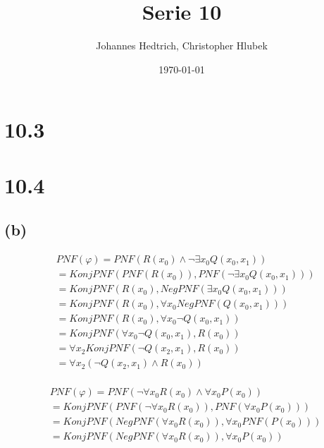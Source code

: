 \documentclass[12pt,a4paper]{scrartcl}
\title{Serie 10}
\author{Johannes Hedtrich, Christopher Hlubek}
\date{\today}
\begin{document}
  \section*{10.3}
  
  \section*{10.4}
  
  \subsection*{(b)}
    \begin{align*}
      & PNF(\varphi) = PNF(R(x_0) \wedge \neg \exists x_0 Q(x_0, x_1))\\
      &= KonjPNF(PNF(R(x_0)), PNF(\neg \exists x_0 Q(x_0, x_1)))\\
      &= KonjPNF(R(x_0), NegPNF(\exists x_0 Q(x_0, x_1)))\\
      &= KonjPNF(R(x_0), \forall x_0 NegPNF(Q(x_0, x_1)))\\
      &= KonjPNF(R(x_0), \forall x_0 \neg Q(x_0, x_1))\\
      &= KonjPNF(\forall x_0 \neg Q(x_0, x_1), R(x_0))\\
      &= \forall x_2 KonjPNF(\neg Q(x_2, x_1), R(x_0))\\
      &= \forall x_2 (\neg Q(x_2, x_1) \wedge R(x_0))\\
  \end{align*}

  \begin{align*}
      & PNF(\varphi) = PNF(\neg \forall x_0 R(x_0) \wedge \forall x_0 P(x_0))\\
      &= KonjPNF(PNF(\neg \forall x_0 R(x_0)), PNF(\forall x_0 P(x_0)))\\
      &= KonjPNF(NegPNF(\forall x_0 R(x_0)), \forall x_0 PNF(P(x_0)))\\
      &= KonjPNF(NegPNF(\forall x_0 R(x_0)), \forall x_0 P(x_0))\\
  \end{align*}
  
\end{document}
